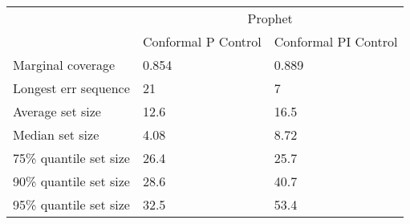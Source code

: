 \begin{tabular}{lll}
\toprule
& \multicolumn{2}{c}{Prophet} \\
& Conformal P Control & Conformal PI Control \\
\midrule
Marginal coverage & 0.854 & 0.889 \\
Longest err sequence & 21 & 7 \\
Average set size & 12.6 & 16.5 \\
Median set size & 4.08 & 8.72 \\
75\% quantile set size & 26.4 & 25.7 \\
90\% quantile set size & 28.6 & 40.7 \\
95\% quantile set size & 32.5 & 53.4 \\
\bottomrule
\end{tabular}
